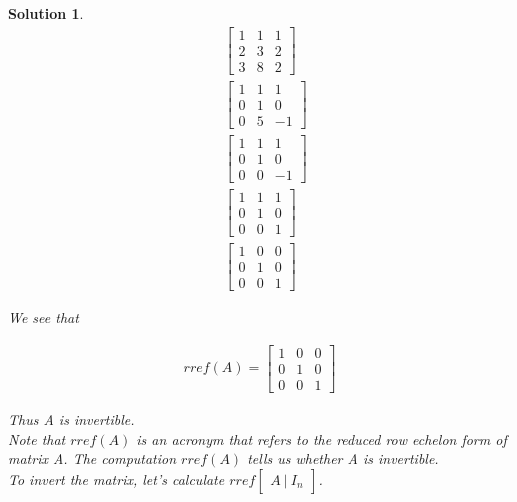 \documentclass{article}
\newtheorem*{solution}{Solution}
\begin{document}
\begin{solution}
\begin{align*}
& \begin{bmatrix}
1 & 1 & 1 \\
2 & 3 & 2 \\
3 & 8 & 2
\end{bmatrix} \\
& \begin{bmatrix}
1 & 1 & 1 \\
0 & 1 & 0 \\
0 & 5 & -1
\end{bmatrix} \\
& \begin{bmatrix}
1 & 1 & 1 \\
0 & 1 & 0 \\
0 & 0 & -1
\end{bmatrix} \\
& \begin{bmatrix}
1 & 1 & 1 \\
0 & 1 & 0 \\
0 & 0 & 1
\end{bmatrix} \\
& \begin{bmatrix}
1 & 0 & 0 \\
0 & 1 & 0 \\
0 & 0 & 1
\end{bmatrix}
\end{align*}

We see that 

\begin{align*}
rref(A) = \begin{bmatrix}
1 & 0 & 0 \\
0 & 1 & 0 \\
0 & 0 & 1
\end{bmatrix}
\end{align*}

Thus A is invertible. \\

Note that $rref(A)$ is an acronym that refers to the reduced row echelon form of matrix A. The computation $rref(A)$ tells us whether A is invertible. \\

To invert the matrix, let's calculate $rref \begin{bmatrix} A \ \vert \ I_{n} \end{bmatrix}$. \\


\end{solution}
\end{document}
